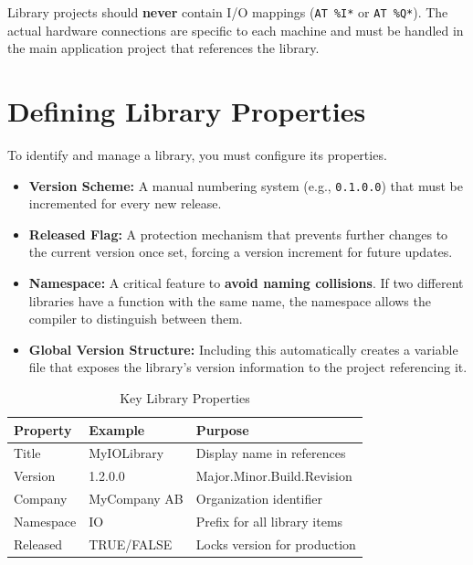 \documentclass[11pt,a4paper]{article}
\begin{document}
\begin{warningbox}
Library projects should \textbf{never} contain I/O mappings (\texttt{AT \%I*} or \texttt{AT \%Q*}). The actual hardware connections are specific to each machine and must be handled in the main application project that references the library.
\end{warningbox}

\section{Defining Library Properties}

To identify and manage a library, you must configure its properties.

\begin{itemize}[leftmargin=*]
    \item \textbf{Version Scheme:} A manual numbering system (e.g., \texttt{0.1.0.0}) that must be incremented for every new release.
    \item \textbf{Released Flag:} A protection mechanism that prevents further changes to the current version once set, forcing a version increment for future updates.
    \item \textbf{Namespace:} A critical feature to \textbf{avoid naming collisions}. If two different libraries have a function with the same name, the namespace allows the compiler to distinguish between them.
    \item \textbf{Global Version Structure:} Including this automatically creates a variable file that exposes the library's version information to the project referencing it.
\end{itemize}

\begin{table}[h]
\centering
\begin{tabular}{@{}llp{6cm}@{}}
\toprule
\textbf{Property} & \textbf{Example} & \textbf{Purpose} \\
\midrule
Title & MyIOLibrary & Display name in references \\
Version & 1.2.0.0 & Major.Minor.Build.Revision \\
Company & MyCompany AB & Organization identifier \\
Namespace & IO & Prefix for all library items \\
Released & TRUE/FALSE & Locks version for production \\
\bottomrule
\end{tabular}
\caption{Key Library Properties}
\end{table}
\end{document}
